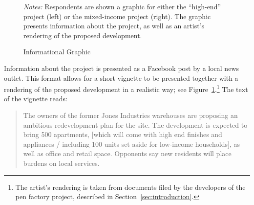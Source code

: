 \documentclass[article,11pt]{memoir}
\begin{document}
\begin{figure}[t] 
  \caption{Informational Graphic}
  \label{fig:e_treatment}  
  \begin{measuredfigure}
  \end{measuredfigure}
  \begin{tablenotes}[flushleft]
    \item \hspace{-.2em}\emph{Notes:} Respondents are shown a graphic for either the ``high-end'' project (left) or the mixed-income project (right). The graphic presents information about the project, as well as an artist's rendering of the proposed development.
  \end{tablenotes}
\end{figure}

Information about the project is presented as a Facebook post by a local news outlet.  This format allows for a short vignette to be presented together with a rendering of the proposed development in a realistic way; see Figure~\ref{fig:e_treatment}.\footnote{The artist's rendering is taken from documents filed by the developers of the pen factory project, described in Section~\ref{sec:introduction}.}  The text of the vignette reads:

\begin{quote}
The owners of the former Jones Industries warehouses are proposing an ambitious redevelopment plan for the site. The development is expected to bring 500 apartments, [which will come with high end finishes and appliances / including 100 units set aside for low-income households], as well as office and retail space. Opponents say new residents will place burdens on local services.
\end{quote}
\end{document}
